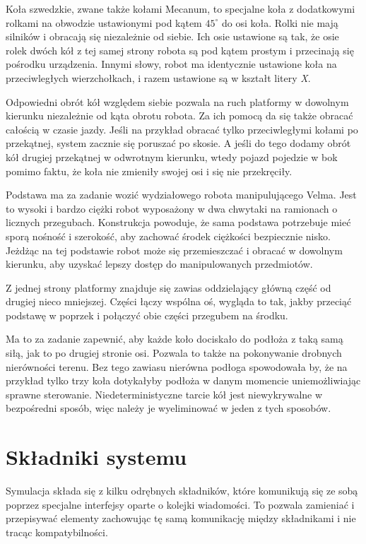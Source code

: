 Koła szwedzkie, zwane także kołami Mecanum, to specjalne koła z dodatkowymi rolkami na obwodzie ustawionymi pod kątem $45^\circ$ do osi koła.
Rolki nie mają silników i obracają się niezależnie od siebie.
Ich osie ustawione są tak, że osie rolek dwóch kół z tej samej strony robota są pod kątem prostym i przecinają się pośrodku urządzenia.
Innymi słowy, robot ma identycznie ustawione koła na przeciwległych wierzchołkach, i razem ustawione są w kształt litery \emph{X}.

Odpowiedni obrót kół względem siebie pozwala na ruch platformy w dowolnym kierunku niezależnie od kąta obrotu robota.
Za ich pomocą da się także obracać całością w czasie jazdy.
Jeśli na przykład obracać tylko przeciwległymi kołami po przekątnej, system zacznie się poruszać po skosie.
A jeśli do tego dodamy obrót kół drugiej przekątnej w odwrotnym kierunku, wtedy pojazd pojedzie w bok pomimo faktu, że koła nie zmieniły swojej osi i się nie przekręciły.

Podstawa ma za zadanie wozić wydziałowego robota manipulującego Velma.
Jest to wysoki i bardzo ciężki robot wyposażony w dwa chwytaki na ramionach o licznych przegubach.
Konstrukcja powoduje, że sama podstawa potrzebuje mieć sporą nośność i szerokość, aby zachować środek ciężkości bezpiecznie nisko.
Jeżdżąc na tej podstawie robot może się przemieszczać i obracać w dowolnym kierunku, aby uzyskać lepszy dostęp do manipulowanych przedmiotów.

Z jednej strony platformy znajduje się zawias oddzielający główną część od drugiej nieco mniejszej.
Części łączy wspólna oś, wygląda to tak, jakby przeciąć podstawę w poprzek i połączyć obie części przegubem na środku.

Ma to za zadanie zapewnić, aby każde koło dociskało do podłoża z taką samą siłą, jak to po drugiej stronie osi.
Pozwala to także na pokonywanie drobnych nierówności terenu.
Bez tego zawiasu nierówna podłoga spowodowała by, że na przykład tylko trzy koła dotykałyby podłoża w danym momencie uniemożliwiając sprawne sterowanie.
Niedeterministyczne tarcie kół jest niewykrywalne w bezpośredni sposób, więc należy je wyeliminować w jeden z tych sposobów.

\section{Składniki systemu}
Symulacja składa się z kilku odrębnych składników, które komunikują się ze sobą poprzez specjalne interfejsy oparte o kolejki wiadomości.
To pozwala zamieniać i przepisywać elementy zachowując tę samą komunikację między składnikami i nie tracąc kompatybilności.

